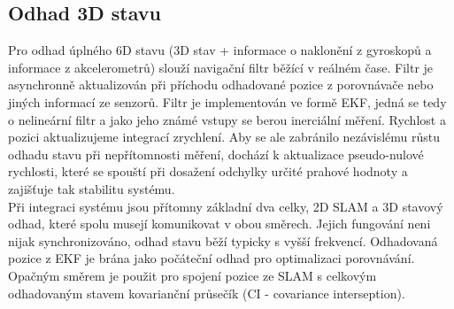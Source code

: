 \documentclass[11pt]{article}
\begin{document}
\subsection{Odhad 3D stavu}
Pro odhad úplného 6D stavu (3D stav + informace o naklonění z gyroskopů a informace z akcelerometrů) slouží navigační filtr běžící v reálném čase. Filtr je asynchronně aktualizován při příchodu odhadované pozice z porovnávače nebo jiných informací ze senzorů. Filtr je implementován ve formě EKF, jedná se tedy o nelineární filtr a jako jeho známé vstupy se berou inerciální měření. Rychlost a pozici aktualizujeme integrací zrychlení. Aby se ale zabránilo nezávislému růstu odhadu stavu při nepřítomnosti měření, dochází k aktualizace pseudo-nulové rychlosti, které se spouští při dosažení odchylky určité prahové hodnoty a zajišťuje tak stabilitu systému.\\
\indent Při integraci systému jsou přítomny základní dva celky, 2D SLAM a 3D stavový odhad, které spolu musejí komunikovat v obou směrech. Jejich fungování neni nijak synchronizováno, odhad stavu běží typicky s vyšší frekvencí. Odhadovaná pozice z EKF je brána jako počáteční odhad pro optimalizaci porovnávání. Opačným směrem je použit pro spojení pozice ze SLAM s celkovým odhadovaným stavem kovarianční průsečík (CI - covariance interseption).
\end{document}

